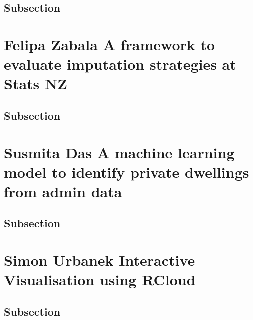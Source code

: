 \documentclass[
]{book}
\begin{document}
\hypertarget{subsection}{%
\section{Subsection}\label{subsection}}

\hypertarget{felipa-zabala-a-framework-to-evaluate-imputation-strategies-at-stats-nz}{%
\chapter*{Felipa Zabala \textbar{} A framework to evaluate imputation strategies at Stats NZ}\label{felipa-zabala-a-framework-to-evaluate-imputation-strategies-at-stats-nz}}

\hypertarget{subsection}{%
\section{Subsection}\label{subsection}}

\hypertarget{susmita-das-a-machine-learning-model-to-identify-private-dwellings-from-admin-data}{%
\chapter*{Susmita Das \textbar{} A machine learning model to identify private dwellings from admin data}\label{susmita-das-a-machine-learning-model-to-identify-private-dwellings-from-admin-data}}

\hypertarget{subsection}{%
\section{Subsection}\label{subsection}}

\hypertarget{simon-urbanek-interactive-visualisation-using-rcloud}{%
\chapter*{Simon Urbanek \textbar{} Interactive Visualisation using RCloud}\label{simon-urbanek-interactive-visualisation-using-rcloud}}

\hypertarget{subsection}{%
\section{Subsection}\label{subsection}}
\end{document}
